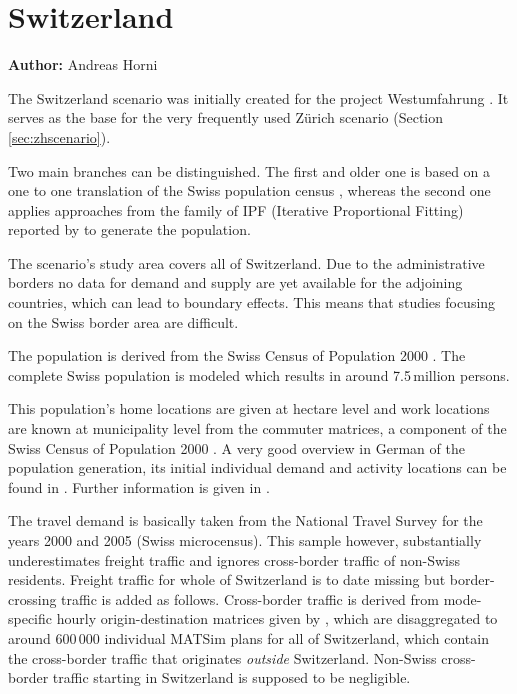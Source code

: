 \section{Switzerland}
\hfill \textbf{Author:} Andreas Horni

The Switzerland scenario was initially created for the project Westumfahrung \citep[][]{BalmerEtAl_ResRep_bdktzrh_2009}. It serves as the base for the very frequently used Zürich scenario (Section \ref{sec:zhscenario}). 

Two main branches can be distinguished. The first and older one is based on a one to one translation of the Swiss population census \citep[][]{BfS_VZ_2000}, whereas the second one applies approaches from the family of IPF (Iterative Proportional Fitting) reported by \citet[][]{MuellerKAxhausen_TechRep_IVT_2013, Mueller_unpub_LATSIS_2012, Mueller_unpub_ETC_2011, Mueller_unpub_STRC_2011, Mueller_unpub_IATBR_2012} to generate the population.

The scenario's study area covers all of Switzerland. Due to the administrative borders no data for demand and supply are yet available for the adjoining countries, which can lead to boundary effects. This means that studies focusing on the Swiss border area are difficult.

The population is derived from the Swiss Census of Population 2000 \citep[][]{BfS_VZ_2000}. The complete Swiss population is modeled which results in around 7.5\,million persons. 

This population's home locations are given at hectare level and work locations are known at municipality level from the commuter matrices, a component of the Swiss Census of Population 2000 \citep[][p.35]{BalmerEtAl_ResRep_bdktzrh_2009}. A very good overview in German of the population generation, its initial individual demand and activity locations can be found in \citet{MeisterEtAl_SVT_2009}. Further information is given in \citet[][]{CiariEtAl_STRC_2008, MeisterEtAl_WCTRS_2010, BalmerEtAl_ResRep_bdktzrh_2009, BalmerEtAl_ResRep_datapuls_2010, BalmerEtAl_HEUREKA_2008}.

The travel demand is basically taken from the National Travel Survey for the years 2000 and 2005 \citep[][]{BfS-MZ2005_manual_2006} (Swiss microcensus). This sample however, substantially underestimates freight traffic and ignores cross-border traffic of non-Swiss residents. Freight traffic for whole of Switzerland is to date missing but border-crossing traffic is added as follows. Cross-border traffic is derived from mode-specific hourly origin-destination matrices given by \citet[][]{VrticEtAl_ResRep_UVEK_2007}, which are disaggregated to around 600\,000 individual MATSim plans for all of Switzerland, which contain the cross-border traffic that originates \emph{outside} Switzerland. Non-Swiss cross-border traffic starting in Switzerland is supposed to be negligible. 

